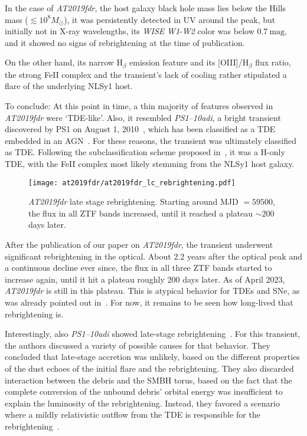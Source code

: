 In the case of \emph{AT2019fdr}, the host galaxy black hole mass lies below the Hills mass ($\lesssim 10^8 M_\odot$), it was persistently detected in UV around the peak, but initially not in X-ray wavelengths, its \textit{WISE} \textit{W1}-\textit{W2} color was below $0.7~\text{mag}$, and it showed no signs of rebrightening at the time of publication.

On the other hand, its narrow H$_\beta$ emission feature and its [OIII]/H$_\beta$ flux ratio, the strong FeII complex and the transient's lack of cooling rather stipulated a flare of the underlying NLSy1 host.

To conclude: At this point in time, a thin majority of features observed in \emph{AT2019fdr} were `TDE-like'. Also, it resembled \emph{PS1--10adi}, a bright transient discovered by PS1 on August 1, 2010~, which has been classified as a TDE embedded in an AGN~. For these reasons, the transient was ultimately classified as TDE. Following the subclassification scheme proposed in~, it was a H-only TDE, with the FeII complex most likely stemming from the NLSy1 host galaxy.

\begin{figure}[htb]
    \texttt{[image: at2019fdr/at2019fdr\_lc\_rebrightening.pdf]}
    \caption[\emph{AT2019fdr} rebrightening]{\emph{AT2019fdr} late stage rebrightening. Starting around MJD $=59500$, the flux in all ZTF bands increased, until it reached a plateau $\sim 200$ days later.}
\end{figure}

After the publication of our paper on \emph{AT2019fdr}, the transient underwent significant rebrightening in the optical. About 2.2 years after the optical peak and a continuous decline ever since, the flux in all three ZTF bands started to increase again, until it hit a plateau roughly 200 days later. As of April 2023, \emph{AT2019fdr} is still in this plateau. This is atypical behavior for TDEs and SNe, as was already pointed out in~\cite{Frederick2021}. For now, it remains to be seen how long-lived that rebrightening is.

Interestingly, also \emph{PS1--10adi} showed late-stage rebrightening~\cite{Jiang2019}. For this transient, the authors discussed a variety of possible causes for that behavior. They concluded that late-stage accretion was unlikely, based on the different properties of the dust echoes of the initial flare and the rebrightening. They also discarded interaction between the debris and the SMBH torus, based on the fact that the complete conversion of the unbound debris' orbital energy was insufficient to explain the luminosity of the rebrightening. Instead, they favored a scenario where a mildly relativistic outflow from the TDE is responsible for the rebrightening~\cite{Jiang2019}.

